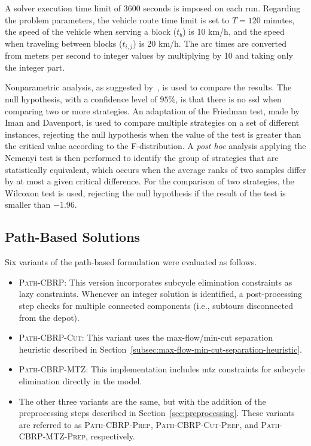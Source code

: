 A solver execution time limit of 3600 seconds is imposed on each run. Regarding the problem parameters, the vehicle route time limit is set to $T = 120$ minutes, the speed of the vehicle when serving a block ($t_b$) is 10 km/h, and the speed when traveling between blocks ($t_{i, j}$) is 20 km/h. The arc times are converted from meters per second to integer values by multiplying by 10 and taking only the integer part.

Nonparametric analysis, as suggested by~\cite{demsar:2006}, is used to compare the results. The null hypothesis, with a confidence level of $95\%$, is that there is no \gls{ssd} when comparing two or more strategies. An adaptation of the Friedman test, made by Iman and Davenport, is used to compare multiple strategies on a set of different instances, rejecting the null hypothesis when the value of the test is greater than the critical value according to the F-distribution. A {\em post hoc} analysis applying the Nemenyi test is then performed to identify the group of strategies that are statistically equivalent, which occurs when the average ranks of two samples differ by at most a given critical difference. For the comparison of two strategies, the Wilcoxon test is used, rejecting the null hypothesis if the result of the test is smaller than $-1.96$.

\subsection{Path-Based Solutions}\label{subsec:path-based-solutions}

Six variants of the path-based formulation were evaluated as follows.

\begin{itemize}
	\item \textsc{Path-CBRP}: This version incorporates subcycle elimination constraints as lazy constraints. Whenever an integer solution is identified, a post-processing step checks for multiple connected components (i.e., subtours disconnected from the depot).
	\item \textsc{Path-CBRP-Cut}: This variant uses the max-flow/min-cut separation heuristic described in Section~\ref{subsec:max-flow-min-cut-separation-heuristic}.
	\item \textsc{Path-CBRP-MTZ}: This implementation includes \gls{mtz} constraints for subcycle elimination directly in the model.
	\item The other three variants are the same, but with the addition of the preprocessing steps described in Section~\ref{sec:preprocessing}. These variants are referred to as \textsc{Path-CBRP-Prep}, \textsc{Path-CBRP-Cut-Prep}, and \textsc{Path-CBRP-MTZ-Prep}, respectively.
\end{itemize}

